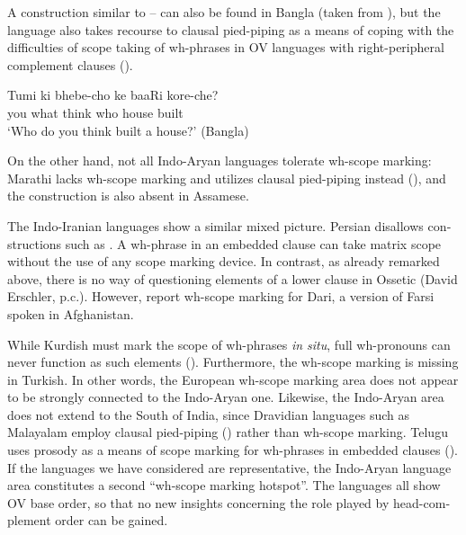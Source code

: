 \documentclass[output=paper,colorlinks,citecolor=brown]{langscibook}
\begin{document}
\begin{otherlanguage}{english}
\noindent A construction similar to -- can also be found in Bangla  (taken from \citealt{Bayer1996}), but the language also takes recourse to clausal pied-piping as a means of coping with the difficulties of scope taking of wh-phrases in OV languages with right-peripheral complement clauses (\citealt{Simpson-Bhattacharya2003}).

\ea 
\gll  Tumi 	ki 	bhebe-cho 	ke 	baaRi 	kore-che?  \\
        you	what	think		who	house	built \\
    \glt    ‘Who do you think built a house?' \hfill (Bangla)\label{ex:fanselow:40}
    \z

\noindent On the other hand, not all Indo-Aryan languages tolerate wh-scope marking: Marathi lacks wh-scope marking and utilizes clausal pied-piping instead (\citealt[247]{Dhongde-Wali2009}), and the construction is also absent in Assamese.

The Indo-Iranian languages show a similar mixed picture. Persian disallows constructions such as . A wh-phrase in an embedded clause can take matrix scope without the use of any scope marking device. In contrast, as already remarked above, there is no way of questioning elements of a lower clause in Ossetic (David Erschler, p.c.). However, \citet{Karimi-Taleghani2007} report wh-scope marking for Dari, a version of Farsi spoken in Afghanistan.

    \label{ex:fanselow:41}
    \z

\noindent While Kurdish must mark the scope of wh-phrases \textit{in situ}, full wh-pronouns can never function as such elements (\citealt{Hamid2019}). Furthermore, the wh-scope marking is missing in Turkish. In other words, the European wh-scope marking area does not appear to be strongly connected to the Indo-Aryan one. Likewise, the Indo-Aryan area does not extend to the South of India, since Dravidian languages such as Malayalam employ clausal pied-piping (\citealt{Aravind2018}) rather than wh-scope marking. Telugu uses prosody as a means of scope marking for wh-phrases in embedded clauses (\citealt{Giblin-Steddy2014}). If the languages we have considered are representative, the Indo-Aryan language area constitutes a second “wh-scope marking hotspot”. The languages all show OV base order, so that no new insights concerning the role played by head-complement order can be gained. 


\end{otherlanguage}
\end{document}
